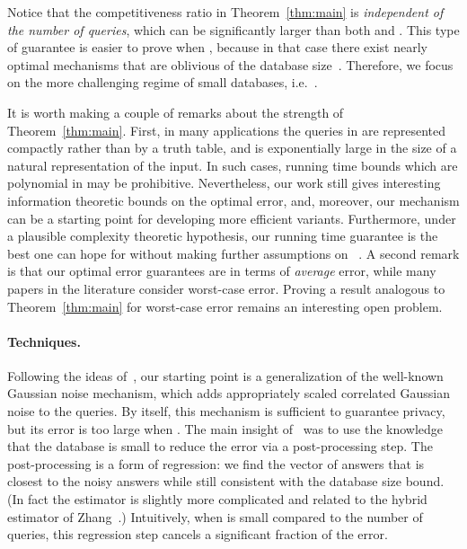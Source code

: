 \documentclass{article}
\newcommand\junk[1]{}
\begin{document}
Notice that the competitiveness ratio in Theorem~\ref{thm:main} is
\emph{independent of the number of queries}, which can be
significantly larger than both  and . This type of
guarantee is easier to prove when , because in that case
there exist nearly optimal mechanisms that are oblivious of the
database size~\cite{NTZ}. Therefore, we focus on the more
challenging regime of small databases, i.e.~. 

It is worth making a couple of remarks about the strength of
Theorem~\ref{thm:main}. First, in many applications the queries in
 are represented compactly rather than by a truth table, and
 is exponentially large in the size of a natural
representation of the input. In such cases, running time bounds which
are polynomial in  may be prohibitive. Nevertheless, our work
still gives interesting information theoretic bounds on the optimal
error, and, moreover, our mechanism can be a starting point for
developing more efficient variants. Furthermore, under a plausible
complexity theoretic hypothesis, our running time guarantee is the
best one can hope for without making further assumptions on
~\cite{Ullman13}. A second remark is that our optimal error
guarantees are in terms of \emph{average} error, while many papers in
the literature consider worst-case error. Proving a result analogous
to Theorem~\ref{thm:main} for worst-case error remains an interesting
open problem.

\junk{Another
interesting problem is to remove the dependence on the universe size
in the competitiveness ratio. It is plausible that this can be done
with the projection mechanism and a well-chosen Gaussian noise
distribution, but we would need tighter lower bounds, possibly based
on fingerprinting codes as in~\cite{BunUV13}.}






\paragraph{Techniques.}
Following the ideas of~\cite{NTZ}, our starting point is a
generalization of the well-known Gaussian noise mechanism, which adds
appropriately scaled correlated Gaussian noise to the queries. By
itself, this mechanism is sufficient to guarantee privacy, but its
error is too large when . The main insight
of~\cite{NTZ} was to use the knowledge that the database is small to
reduce the error via a post-processing step. The post-processing is a
form of regression: we find the vector of answers that is closest to the
noisy answers while still consistent with the database size bound.
(In fact the estimator is slightly more complicated and related to the
hybrid estimator of Zhang~\cite{Zhang13-hybrid}.)  Intuitively, when
 is small compared to the number of queries, this regression step
cancels a significant fraction of the error.
\end{document}
